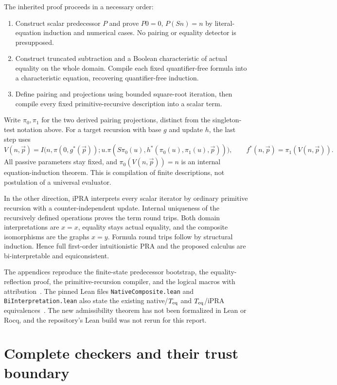 \documentclass[11pt]{article}
\theoremstyle{definition}\newtheorem{definition}[theorem]{Definition}
\theoremstyle{remark}\newtheorem{remark}[theorem]{Remark}
\newcommand{\file}[1]{\texttt{#1}}
\begin{document}
The inherited proof proceeds in a necessary order:
\begin{enumerate}
\item Construct scalar predecessor $P$ and prove $P0=0$, $P(Sn)=n$ by
literal-equation induction and numerical cases. No pairing or equality
detector is presupposed.
\item Construct truncated subtraction and a Boolean characteristic of actual
equality on the whole domain. Compile each fixed quantifier-free formula
into a characteristic equation, recovering quantifier-free induction.
\item Define pairing and projections using bounded square-root iteration,
then compile every fixed primitive-recursive description into a scalar term.
\end{enumerate}
Write $\pi_0,\pi_1$ for the two derived pairing projections, distinct from
the singleton-test notation above. For a target recursion with base $g$
and update $h$, the last step uses
\[
 V(n,\vec p)=I\bigl(n,\pi(0,g^*(\vec p));
 u.\pi(S\pi_0(u),h^*(\pi_0(u),\pi_1(u),\vec p))\bigr),
 \qquad f^*(n,\vec p)=\pi_1(V(n,\vec p)).
\]
All passive parameters stay fixed, and $\pi_0(V(n,\vec p))=n$ is an internal
equation-induction theorem. This is compilation of finite descriptions, not
postulation of a universal evaluator.

In the other direction, iPRA interprets every scalar iterator by ordinary
primitive recursion with a counter-independent update. Internal uniqueness
of the recursively defined operations proves the term round trips. Both
domain interpretations are $x=x$, equality stays actual equality, and the
composite isomorphisms are the graphs $x=y$. Formula round trips follow by
structural induction. Hence full first-order intuitionistic PRA and the
proposed calculus are bi-interpretable and equiconsistent.

The appendices reproduce the finite-state predecessor bootstrap, the
equality-reflection proof, the primitive-recursion compiler, and the logical
macros with attribution~\cite{basis,bridge,erasure,forward,progress}.
The pinned Lean files \file{NativeComposite.lean} and
\file{BiInterpretation.lean} also state the existing native/$T_{\rm eq}$ and
$T_{\rm eq}$/iPRA equivalences~\cite{lean}. The new admissibility theorem has
not been formalized in Lean or Rocq, and the repository's Lean build was not
rerun for this report.

\section{Complete checkers and their trust boundary}
\label{sec:implementation}
\end{document}
